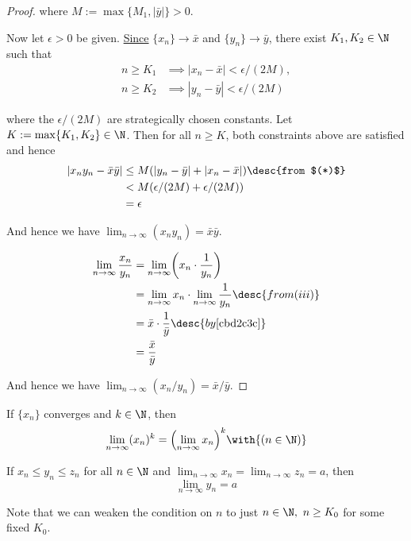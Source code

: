 \begin{proof}
  where $M:=\max\{M_1,|\bar y|\}>0$.

  Now let $\epsilon>0$ be given. \href{e565120}{Since} $\{x_n\}\to\bar x$ and
  $\{y_n\}\to\bar y$, there exist $K_1,K_2\in\N$ such that
  \begin{align*}
    n\geq K_1 &\implies |x_n-\bar x|<\epsilon/(2M), \\
    n\geq K_2 &\implies |y_n-\bar y|<\epsilon/(2M)
  \end{align*}

  where the $\epsilon/(2M)$ are strategically chosen constants. Let
  $K:=\max\{K_1,K_2\}\in\N$. Then for all $n\geq K$, both constraints above are
  satisfied and hence
  \begin{align*}
    |x_ny_n-\bar x\bar y|
     &\leq M(|y_n-\bar y|+|x_n-\bar x|)\desc{from $(*)$} \\
     &<M(\epsilon/(2M)+\epsilon/(2M))                    \\
     &=\epsilon
  \end{align*}

  And hence we have $\lim_{n\to\infty}(x_ny_n)=\bar x\bar y$.

  \begin{align*}
    \lim_{n\to\infty}\frac{x_n}{y_n}
     &=\lim_{n\to\infty}\biggl(x_n\cdot\frac1{y_n}\biggr)                     \\
     &=\lim_{n\to\infty}x_n\cdot\lim_{n\to\infty}\frac1{y_n}\desc{from (iii)} \\
     &=\bar x\cdot\frac1{\bar y}\desc{by \autoref{cbd2c3c}}                   \\
     &=\frac{\bar x}{\bar y}
  \end{align*}

  And hence we have $\lim_{n\to\infty}(x_n/y_n)=\bar x/\bar y$.
\end{proof}

\Corollary{}\label{c182ece}

If $\{x_n\}$ converges and $k\in\N$, then
$$
  \lim_{n\to\infty} (x_n)^k=\Bigl(\lim_{n\to\infty}x_n\Bigr)^k\with{(n\in\N)}
$$

\label{c3364d9}

If $x_n\leq y_n\leq z_n$ for all $n\in\N$ and
$\displaystyle\lim_{n\to\infty}x_n=\lim_{n\to\infty}z_n=a$, then
$$
  \lim_{n\to\infty}y_n=a
$$

Note that we can weaken the condition on $n$ to just $n\in\N,\ n\geq K_0$ for
some fixed $K_0$.

